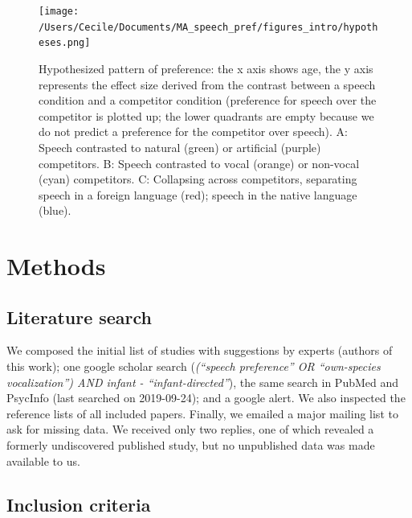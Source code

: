 \documentclass[man]{apa6}
\begin{document}
\begin{figure}
\centering
\texttt{[image: /Users/Cecile/Documents/MA\_speech\_pref/figures\_intro/hypotheses.png]}
\caption{\label{fig:unnamed-chunk-2}Hypothesized pattern of preference: the
x axis shows age, the y axis represents the effect size derived from the
contrast between a speech condition and a competitor condition
(preference for speech over the competitor is plotted up; the lower
quadrants are empty because we do not predict a preference for the
competitor over speech). A: Speech contrasted to natural (green) or
artificial (purple) competitors. B: Speech contrasted to vocal (orange)
or non-vocal (cyan) competitors. C: Collapsing across competitors,
separating speech in a foreign language (red); speech in the native
language (blue).}
\end{figure}

\section{Methods}\label{methods}

\subsection{Literature search}\label{literature-search}

We composed the initial list of studies with suggestions by experts
(authors of this work); one google scholar search
(\emph{(\enquote{speech preference} OR \enquote{own-species
vocalization}) AND infant - \enquote{infant-directed}}), the same search
in PubMed and PsycInfo (last searched on 2019-09-24); and a google
alert. We also inspected the reference lists of all included papers.
Finally, we emailed a major mailing list to ask for missing data. We
received only two replies, one of which revealed a formerly undiscovered
published study, but no unpublished data was made available to us.

\subsection{Inclusion criteria}\label{inclusion-criteria}
\end{document}
